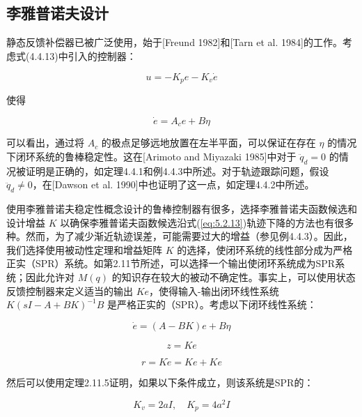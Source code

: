 \documentclass[UTF8,12pt,a4paper]{ctexart}
\begin{document}
\subsection{李雅普诺夫设计}

静态反馈补偿器已被广泛使用，始于[Freund 1982]和[Tarn et al. 1984]的工作。考虑式(4.4.13)中引入的控制器：

\begin{equation}\label{eq:5.2.12}
u = -K_p e - K_v \dot{e}
\end{equation}

使得

\begin{equation}\label{eq:5.2.13}
\dot{e} = A_c e + B\eta
\end{equation}

可以看出，通过将 $A_c$ 的极点足够远地放置在左半平面，可以保证在存在 $\eta$ 的情况下闭环系统的鲁棒稳定性。这在[Arimoto and Miyazaki 1985]中对于 $\ddot{q}_d = 0$ 的情况被证明是正确的，如定理4.4.1和例4.4.3中所述。对于轨迹跟踪问题，假设 $\ddot{q}_d \neq 0$，在[Dawson et al. 1990]中也证明了这一点，如定理4.4.2中所述。

使用李雅普诺夫稳定性概念设计的鲁棒控制器有很多，选择李雅普诺夫函数候选和设计增益 $K$ 以确保李雅普诺夫函数候选沿式(\ref{eq:5.2.13})轨迹下降的方法也有很多种。然而，为了减少渐近轨迹误差，可能需要过大的增益（参见例4.4.3）。因此，我们选择使用被动性定理和增益矩阵 $K$ 的选择，使闭环系统的线性部分成为严格正实（SPR）系统。如第2.11节所述，可以选择一个输出使闭环系统成为SPR系统；因此允许对 $M(q)$ 的知识存在较大的被动不确定性。事实上，可以使用状态反馈控制器来定义适当的输出 $Ke$，使得输入-输出闭环线性系统 $K(sI - A + BK)^{-1}B$ 是严格正实的（SPR）。考虑以下闭环线性系统：

\begin{equation}
\dot{e} = (A - BK)e + B\eta
\end{equation}

\begin{equation}
z = Ke
\end{equation}

\begin{equation}\label{eq:5.2.14}
r = K\dot{e} = Ke + Ke
\end{equation}

然后可以使用定理2.11.5证明，如果以下条件成立，则该系统是SPR的：

\begin{equation}\label{eq:5.2.15}
K_v = 2aI, \quad K_p = 4a^2I
\end{equation}
\end{document}

